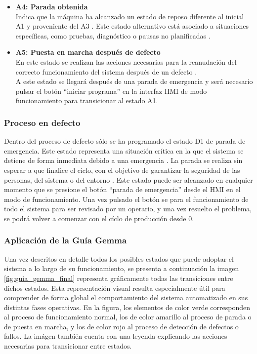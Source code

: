 \begin{itemize}
    \item \textbf{A4: Parada obtenida} \\
    Indica que la máquina ha alcanzado un estado de reposo diferente al inicial A1 y proveniente del A3 \cite{guia_gemma}. Este estado alternativo está asociado a situaciones específicas, como pruebas, diagnóstico o pausas no planificadas \cite{guia_gemma}. 
    
   \item \textbf{A5: Puesta en marcha después de defecto} \\
   En este estado se realizan las acciones necesarias para la reanudación del correcto funcionamiento del sistema después de un defecto \cite{guia_gemma}. \\
   A este estado se llegará después de una parada de emergencia y será necesario pulsar el botón ``iniciar programa'' en la interfaz HMI de modo funcionamiento para transicionar al estado A1.
\end{itemize}

\subsubsection{Proceso en defecto}

Dentro del proceso de defecto sólo se ha programado el estado D1 de parada de emergencia. Este estado representa una situación crítica en la que el sistema se detiene de forma inmediata debido a una emergencia \cite{guia_gemma}. La parada se realiza sin esperar a que finalice el ciclo, con el objetivo de garantizar la seguridad de las personas, del sistema o del entorno \cite{guia_gemma}. Este estado puede ser alcanzado en cualquier momento que se presione el botón ``parada de emergencia'' desde el HMI en el modo de funcionamiento. Una vez pulsado el botón se para el funcionamiento de todo el sistema para ser revisado por un operario, y una vez resuelto el problema, se podrá volver a comenzar con el cíclo de producción desde 0.

\subsubsection{Aplicación de la Guía Gemma}

Una vez descritos en detalle todos los posibles estados que puede adoptar el sistema a lo largo de su funcionamiento, se presenta a continuación la imagen \ref{fig:guia_gemma_final} representa gráficamente todas las transiciones entre dichos estados. Esta representación visual resulta especialmente útil para comprender de forma global el comportamiento del sistema automatizado en sus distintas fases operativas. En la figura, los elementos de color verde corresponden al proceso de funcionamiento normal, los de color amarillo al proceso de parada o de puesta en marcha, y los de color rojo al proceso de detección de defectos o fallos. La imágen también cuenta con una leyenda explicando las acciones necesarias para transicionar entre estados.


